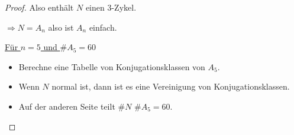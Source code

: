 \documentclass[12pt,parskip=full]{scrartcl}
\newcommand{\heading}{\underline}
\theoremstyle{definition}
\theoremstyle{remark}
\begin{document}
\begin{proof}
		Also enthält $N$ einen $3$-Zykel.
		
		$\Rightarrow N = A_n$ also ist $A_n$ einfach.
		
		\heading{Für $n=5$ und $\#A_5 = 60$}
		\begin{itemize}
			\item Berechne eine Tabelle von Konjugationsklassen von $A_5$.
			\item Wenn $N$ normal ist, dann ist es eine Vereinigung von Konjugationsklassen.
			\item Auf der anderen Seite teilt $\#N$ $\#A_5 = 60$.
		\end{itemize}
	\end{proof}
	
\end{document}
